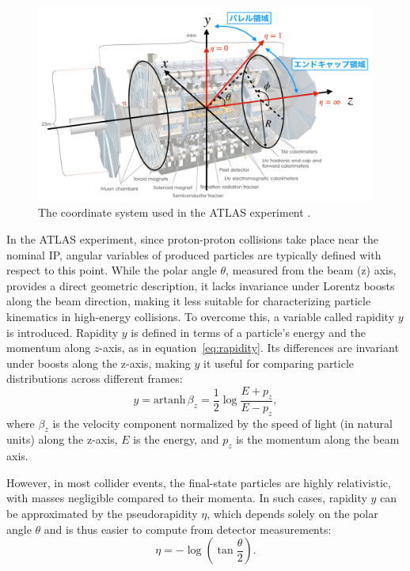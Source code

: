 \begin{figure}[htbp]
  \centering
  \includegraphics[width=1.0\textwidth]{figs/chapter2/ATLAS_coordinate.png}
  \caption{The coordinate system used in the ATLAS experiment \cite{mino}.}
  \label{fig:ATLASCoordinate}
\end{figure}

In the ATLAS experiment, since proton-proton collisions take place near the nominal IP, angular variables of produced particles are typically defined with respect to this point. While the polar angle \(\theta\), measured from the beam (z) axis, provides a direct geometric description, it lacks invariance under Lorentz boosts along the beam direction, making it less suitable for characterizing particle kinematics in high-energy collisions.
To overcome this, a variable called rapidity \(y\) is introduced. Rapidity \(y\) is defined in terms of a particle's energy and the momentum along \(z\)-axis, as in equation~\ref{eq:rapidity}. Its differences are invariant under boosts along the z-axis, making \(y\) it useful for comparing particle distributions across different frames:
\begin{equation}
  y = \mathrm{artanh}\, \beta_z = \frac{1}{2} \log \frac{E + p_z}{E - p_z},
  \label{eq:rapidity}
\end{equation}
where \(\beta_z\) is the velocity component normalized by the speed of light (in natural units) along the z-axis, \(E\) is the energy, and \(p_z\) is the momentum along the beam axis.

However, in most collider events, the final-state particles are highly relativistic, with masses negligible compared to their momenta. In such cases, rapidity \(y\) can be approximated by the pseudorapidity \(\eta\), which depends solely on the polar angle \(\theta\) and is thus easier to compute from detector measurements:
\begin{equation}
  \eta = -\log\left( \tan \frac{\theta}{2} \right).
  \label{eq:pseudorapidity}
\end{equation}

